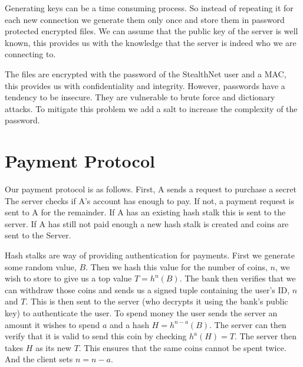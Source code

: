 Generating keys can be a time consuming process. So instead of repeating it for each new connection we generate them only once and store them in password protected encrypted files. We can assume that the public key of the server is well known, this provides us with the knowledge that the server is indeed who we are connecting to.

The files are encrypted with the password of the StealthNet user and a MAC, this provides us with confidentiality and integrity. However, passwords have a tendency to be insecure. They are vulnerable to brute force and dictionary attacks. To mitigate this problem we add a salt to increase the complexity of the password.

\section{Payment Protocol}

Our payment protocol is as follows.
First, A sends a request to purchase a secret
The server checks if A's account has enough to pay.
If not, a payment request is sent to A for the remainder.
If A has an existing hash stalk this is sent to the server.
If A has still not paid enough a new hash stalk is created and coins are sent to the Server.

Hash stalks are way of providing authentication for payments.
First we generate some random value, $B$.
Then we hash this value for the number of coins, $n$, we wish to store to give us a top value $T = h^n(B)$.
The bank then verifies that we can withdraw those coins and sends us a signed tuple containing the user's ID, $n$ and $T$.
This is then sent to the server (who decrypts it using the bank's public key) to authenticate the user.
To spend money the user sends the server an amount it wishes to spend $a$ and a hash $H = h^{n-a}(B)$.
The server can then verify that it is valid to send this coin by checking $h^a(H) = T$.
The server then takes $H$ as its new $T$. This ensures that the same coins cannot be spent twice.
And the client sets $n = n - a$. 



